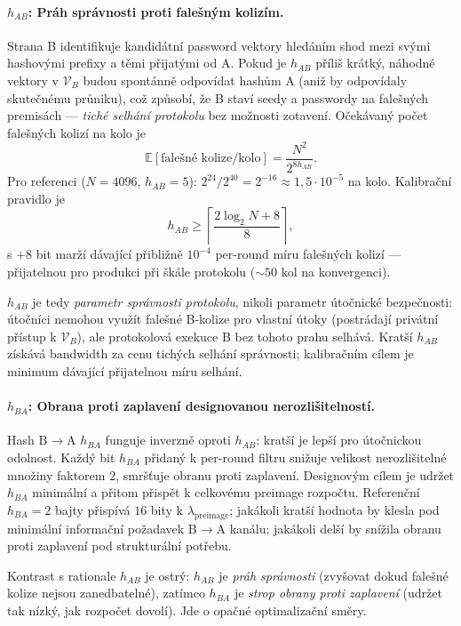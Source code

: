\documentclass[11pt,a4paper]{article}
\begin{document}
\paragraph{$h_{AB}$: Práh správnosti proti falešným kolizím.} Strana B identifikuje kandidátní password vektory hledáním shod mezi svými hashovými prefixy a těmi přijatými od A. Pokud je $h_{AB}$ příliš krátký, náhodné vektory v $\mathcal{V}_B$ budou spontánně odpovídat hashům A (aniž by odpovídaly skutečnému průniku), což způsobí, že B staví seedy a passwordy na falešných premisách --- \emph{tiché selhání protokolu} bez možnosti zotavení. Očekávaný počet falešných kolizí na kolo je
\[
\mathbb{E}[\text{falešné kolize}/\text{kolo}] = \frac{N^2}{2^{8 h_{AB}}}.
\]
Pro referenci ($N = 4096$, $h_{AB} = 5$): $2^{24}/2^{40} = 2^{-16} \approx 1{,}5 \cdot 10^{-5}$ na kolo. Kalibrační pravidlo je
\[
h_{AB} \geq \left\lceil \frac{2 \log_2 N + 8}{8} \right\rceil,
\]
s $+8$ bit marží dávající přibližně $10^{-4}$ per-round míru falešných kolizí --- přijatelnou pro produkci při škále protokolu ($\sim 50$ kol na konvergenci).

$h_{AB}$ je tedy \emph{parametr správnosti protokolu}, nikoli parametr útočnické bezpečnosti: útočníci nemohou využít falešné B-kolize pro vlastní útoky (postrádají privátní přístup k $\mathcal{V}_B$), ale protokolová exekuce B bez tohoto prahu selhává. Kratší $h_{AB}$ získává bandwidth za cenu tichých selhání správnosti; kalibračním cílem je minimum dávající přijatelnou míru selhání.

\paragraph{$h_{BA}$: Obrana proti zaplavení designovanou nerozlišitelností.} Hash B$\to$A $h_{BA}$ funguje inverzně oproti $h_{AB}$: kratší je lepší pro útočnickou odolnost. Každý bit $h_{BA}$ přidaný k per-round filtru snižuje velikost nerozlišitelné množiny faktorem $2$, smršťuje obranu proti zaplavení. Designovým cílem je udržet $h_{BA}$ minimální a přitom přispět k celkovému preimage rozpočtu. Referenční $h_{BA} = 2$ bajty přispívá $16$ bity k $\lambda_\text{preimage}$; jakákoli kratší hodnota by klesla pod minimální informační požadavek B$\to$A kanálu; jakákoli delší by snížila obranu proti zaplavení pod strukturální potřebu.

Kontrast s rationale $h_{AB}$ je ostrý: $h_{AB}$ je \emph{práh správnosti} (zvyšovat dokud falešné kolize nejsou zanedbatelné), zatímco $h_{BA}$ je \emph{strop obrany proti zaplavení} (udržet tak nízký, jak rozpočet dovolí). Jde o opačné optimalizační směry.
\end{document}
